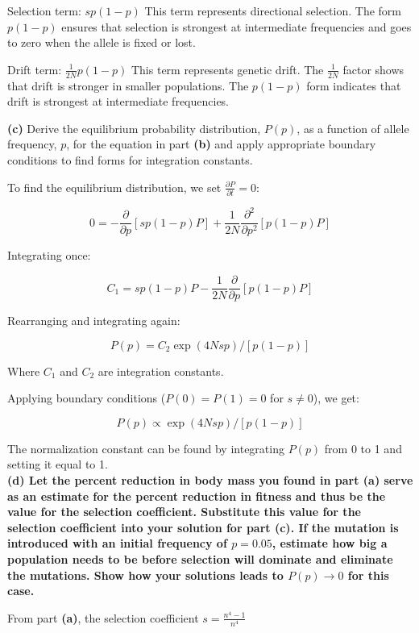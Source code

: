 \documentclass{article}
\begin{document}
Selection term: \( sp(1-p) \)
This term represents directional selection. The form \( p(1-p) \) ensures that selection is strongest at intermediate frequencies and goes to zero when the allele is fixed or lost.

Drift term: \( \frac{1}{2N}p(1-p) \)
This term represents genetic drift. The \( \frac{1}{2N} \) factor shows that drift is stronger in smaller populations. The \( p(1-p) \) form indicates that drift is strongest at intermediate frequencies.

\textbf{(c)} Derive the equilibrium probability distribution, \( P(p) \), as a function of allele frequency, \( p \), for the equation in part \textbf{(b)} and apply appropriate boundary conditions to find forms for integration constants.

To find the equilibrium distribution, we set \( \frac{\partial P}{\partial t} = 0 \):

\[
0 = -\frac{\partial}{\partial p}[sp(1-p)P] + \frac{1}{2N}\frac{\partial^2}{\partial p^2}[p(1-p)P]
\]

Integrating once:

\[
C_1 = sp(1-p)P - \frac{1}{2N}\frac{\partial}{\partial p}[p(1-p)P]
\]

Rearranging and integrating again:

\[
P(p) = C_2 \exp(4Nsp) / [p(1-p)]
\]

Where \( C_1 \) and \( C_2 \) are integration constants.

Applying boundary conditions (\( P(0) = P(1) = 0 \) for \( s \neq 0 \)), we get:

\[
P(p) \propto \exp(4Nsp) / [p(1-p)]
\]

The normalization constant can be found by integrating \( P(p) \) from 0 to 1 and setting it equal to 1.\\

\textbf{(d) Let the percent reduction in body mass you found in part \textbf{(a)} serve as an estimate for the percent reduction in fitness and thus be the value for the selection coefficient. Substitute this value for the selection coefficient into your solution for part \textbf{(c)}. If the mutation is introduced with an initial frequency of \( p = 0.05 \), estimate how big a population needs to be before selection will dominate and eliminate the mutations. Show how your solutions leads to \( P(p) \rightarrow 0 \) for this case.}

From part \textbf{(a)}, the selection coefficient \( s = \frac{n^4 - 1}{n^4} \)
\end{document}
